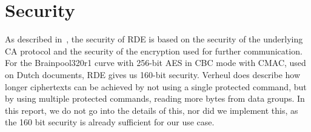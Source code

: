 \section{Security}
\label{sec:security}
As described in~\cite{verheul2017remote}, the security of RDE is based on the security of the underlying CA protocol and the security of the encryption used for further communication.
For the Brainpool320r1 curve with 256-bit AES in CBC mode with CMAC, used on Dutch documents, RDE gives us 160-bit security.
Verheul does describe how longer ciphertexts can be achieved by not using a single protected command, but by using multiple protected commands, reading more bytes from data groups.
In this report, we do not go into the details of this, nor did we implement this, as the 160 bit security is already sufficient for our use case.
